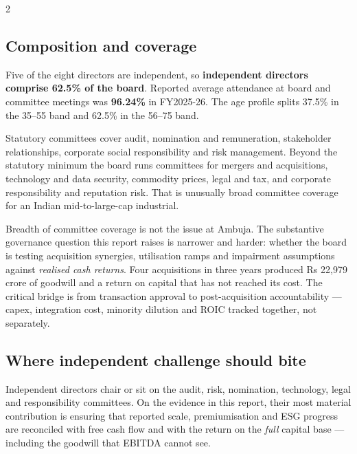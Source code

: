 \vspace{6mm}
\begin{paracol}{2}
\subsection*{Composition and coverage}

Five of the eight directors are independent, so \textbf{independent directors
comprise 62.5\% of the board}. Reported average attendance at board and committee
meetings was \textbf{96.24\%} in FY2025-26. The age profile splits 37.5\% in the
35--55 band and 62.5\% in the 56--75 band.

Statutory committees cover audit, nomination and remuneration, stakeholder
relationships, corporate social responsibility and risk management. Beyond the
statutory minimum the board runs committees for mergers and acquisitions, technology
and data security, commodity prices, legal and tax, and corporate responsibility and
reputation risk. That is unusually broad committee coverage for an Indian
mid-to-large-cap industrial.

\begin{keybox}
Breadth of committee coverage is not the issue at Ambuja. The substantive governance
question this report raises is narrower and harder: whether the board is testing
acquisition synergies, utilisation ramps and impairment assumptions against
\emph{realised cash returns}. Four acquisitions in three years produced Rs 22,979
crore of goodwill and a return on capital that has not reached its cost. The critical
bridge is from transaction approval to post-acquisition accountability — capex,
integration cost, minority dilution and ROIC tracked together, not separately.
\end{keybox}

\switchcolumn
\subsection*{Where independent challenge should bite}

Independent directors chair or sit on the audit, risk, nomination, technology, legal
and responsibility committees. On the evidence in this report, their most material
contribution is ensuring that reported scale, premiumisation and ESG progress are
reconciled with free cash flow and with the return on the \emph{full} capital base —
including the goodwill that EBITDA cannot see.


\end{paracol}
